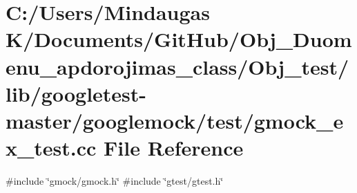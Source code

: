 \hypertarget{_obj__test_2lib_2googletest-master_2googlemock_2test_2gmock__ex__test_8cc}{}\section{C\+:/\+Users/\+Mindaugas K/\+Documents/\+Git\+Hub/\+Obj\+\_\+\+Duomenu\+\_\+apdorojimas\+\_\+class/\+Obj\+\_\+test/lib/googletest-\/master/googlemock/test/gmock\+\_\+ex\+\_\+test.cc File Reference}
\label{_obj__test_2lib_2googletest-master_2googlemock_2test_2gmock__ex__test_8cc}
{\ttfamily \#include \char`\"{}gmock/gmock.\+h\char`\"{}}\newline
{\ttfamily \#include \char`\"{}gtest/gtest.\+h\char`\"{}}\newline
